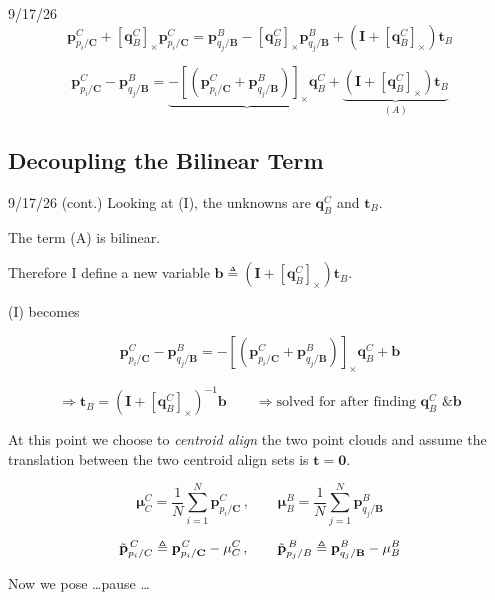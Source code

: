 \documentclass{article}
\newcommand{\vect}[1]{\mathbf{#1}}
\newcommand{\mat}[1]{\mathbf{#1}}
\newcommand{\TCB}{\mat{T}^C_{B}}
\newcommand{\pBjB}{\vect{p}^{\mathit{B}}_{q_{j}/\mathbf{B}}}
\newcommand{\pCiC}{\vect{p}^{\mathit{C}}_{p_{i}/\mathbf{C}}}
\newcommand{\pBCC}{\vect{p}^{\mathit{C}}_{\mathbf{B}/\mathbf{C}}}
\newcommand{\skewop}[1]{\left[#1\right]_{\times}} %
\newcommand{\qCB}{\vect{q}^{C}_{B}} %
\newcommand{\tB}{\vect{t}_B} %
\newcommand{\muC}{\vect{\mu}^{C}_{C}} %
\newcommand{\muB}{\vect{\mu}^{B}_{B}} %
\newcommand{\pCt}{\Tilde{\vect{p}}^{\,C}_{p_i/C}} %
\newcommand{\pBt}{\Tilde{\vect{p}}^{\,B}_{p_j/B}} %
\newcommand{\bvec}{\vect{b}} %
\begin{document}
\begin{authornotes}{9/17/26}
\begin{equation}
    \pCiC + \skewop{\qCB} \pCiC = \pBjB - \skewop{\qCB} \pBjB + \left( \mat{I} + \skewop{\qCB} \right) \tB
\end{equation}

\begin{equation}
    \pCiC - \pBjB = \underbrace{-\skewop{\left( \pCiC + \pBjB \right)} \qCB}_{} + \underbrace{\left( \mat{I} + \skewop{\qCB} \right) \tB}_{(A)} \tag{I}
\end{equation}
\end{authornotes}

\subsection{Decoupling the Bilinear Term}

\begin{authornotes}{9/17/26 (cont.)}
Looking at (I), the unknowns are $\qCB$ and $\tB$.

The term (A) is bilinear.

Therefore I define a new variable $\bvec \triangleq \left( \mat{I} + \skewop{\qCB} \right) \tB$.

(I) becomes

\begin{equation}
    \pCiC - \pBjB = -\skewop{\left( \pCiC + \pBjB \right)} \qCB + \bvec
\end{equation}

\begin{equation}
    \Rightarrow \tB = \left( \mat{I} + \skewop{\qCB} \right)^{-1} \bvec \qquad \Rightarrow \text{solved for after finding } \qCB \text{ \& } \bvec
\end{equation}

At this point we choose to \emph{centroid align} the two point clouds and assume the translation between the two centroid align sets is $\vect{t} = \vect{0}$.

\begin{equation}
    \muC = \frac{1}{N} \sum_{i=1}^{N} \pCiC \, , \qquad \muB = \frac{1}{N} \sum_{j=1}^{N} \pBjB
\end{equation}

\begin{equation}
    \pCt \triangleq \pCiC - \muC \, , \qquad \pBt \triangleq \pBjB - \muB
\end{equation}

Now we pose \dots pause \dots
\end{authornotes}
\end{document}
